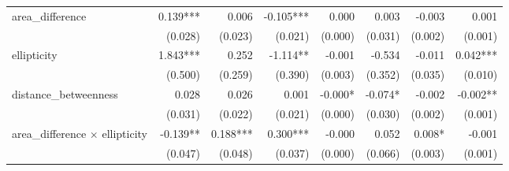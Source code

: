 \begin{tabular}{lrrrrrrr}
area\_difference                           &                     0.139*** &                      0.006 &                    -0.105*** &                            0.000 &                          0.003 &                                                            -0.003 &                                               0.001 \\ 
                                           &                      (0.028) &                    (0.023) &                      (0.021) &                          (0.000) &                        (0.031) &                                                           (0.002) &                                             (0.001) \\ 
ellipticity                                &                     1.843*** &                      0.252 &                     -1.114** &                           -0.001 &                         -0.534 &                                                            -0.011 &                                            0.042*** \\ 
                                           &                      (0.500) &                    (0.259) &                      (0.390) &                          (0.003) &                        (0.352) &                                                           (0.035) &                                             (0.010) \\ 
distance\_betweenness                      &                        0.028 &                      0.026 &                        0.001 &                          -0.000* &                        -0.074* &                                                            -0.002 &                                            -0.002** \\ 
                                           &                      (0.031) &                    (0.022) &                      (0.021) &                          (0.000) &                        (0.030) &                                                           (0.002) &                                             (0.001) \\ 
area\_difference $\times$ ellipticity      &                     -0.139** &                   0.188*** &                     0.300*** &                           -0.000 &                          0.052 &                                                            0.008* &                                              -0.001 \\ 
                                           &                      (0.047) &                    (0.048) &                      (0.037) &                          (0.000) &                        (0.066) &                                                           (0.003) &                                             (0.001) \\ 

\end{tabular}
